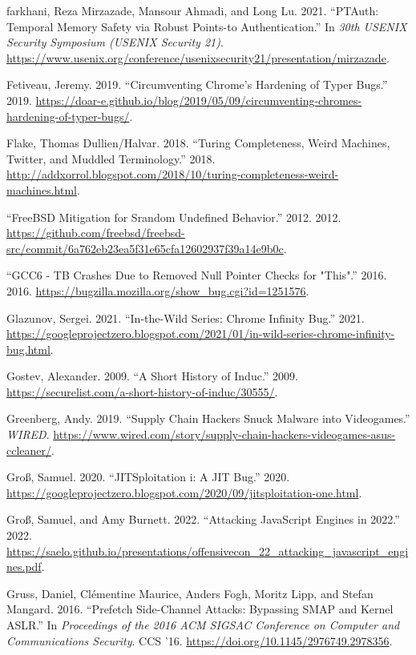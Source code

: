 \documentclass[
  a4paper,
]{report}
\newlength{\cslhangindent}
\newenvironment{CSLReferences}[2] %
{\begin{list}{}{%
	\setlength{\itemindent}{0pt}
	\setlength{\leftmargin}{0pt}
	\setlength{\parsep}{0pt}
	\ifodd #1
	\setlength{\leftmargin}{\cslhangindent}
	\setlength{\itemindent}{-1\cslhangindent}
	\fi
	\setlength{\itemsep}{#2\baselineskip}}}
{\end{list}}
\begin{document}
\begin{CSLReferences}{1}{0}
farkhani, Reza Mirzazade, Mansour Ahmadi, and Long Lu. 2021.
{``{PTAuth}: Temporal Memory Safety via Robust Points-to
Authentication.''} In \emph{30th USENIX Security Symposium (USENIX
Security 21)}.
\url{https://www.usenix.org/conference/usenixsecurity21/presentation/mirzazade}.

Fetiveau, Jeremy. 2019. {``Circumventing Chrome's Hardening of Typer
Bugs.''} 2019.
\url{https://doar-e.github.io/blog/2019/05/09/circumventing-chromes-hardening-of-typer-bugs/}.

Flake, Thomas Dullien/Halvar. 2018. {``Turing Completeness, Weird
Machines, Twitter, and Muddled Terminology.''} 2018.
\url{http://addxorrol.blogspot.com/2018/10/turing-completeness-weird-machines.html}.

{``FreeBSD Mitigation for Srandom Undefined Behavior.''} 2012. 2012.
\url{https://github.com/freebsd/freebsd-src/commit/6a762eb23ea5f31e65cfa12602937f39a14e9b0c}.

{``GCC6 - TB Crashes Due to Removed Null Pointer Checks for "This".''}
2016. 2016. \url{https://bugzilla.mozilla.org/show_bug.cgi?id=1251576}.

Glazunov, Sergei. 2021. {``In-the-Wild Series: Chrome Infinity Bug.''}
2021.
\url{https://googleprojectzero.blogspot.com/2021/01/in-wild-series-chrome-infinity-bug.html}.

Gostev, Alexander. 2009. {``A Short History of Induc.''} 2009.
\url{https://securelist.com/a-short-history-of-induc/30555/}.

Greenberg, Andy. 2019. {``Supply Chain Hackers Snuck Malware into
Videogames.''} \emph{WIRED}.
\url{https://www.wired.com/story/supply-chain-hackers-videogames-asus-ccleaner/}.

Groß, Samuel. 2020. {``JITSploitation i: A JIT Bug.''} 2020.
\url{https://googleprojectzero.blogspot.com/2020/09/jitsploitation-one.html}.

Groß, Samuel, and Amy Burnett. 2022. {``Attacking JavaScript Engines in
2022.''} 2022.
\url{https://saelo.github.io/presentations/offensivecon_22_attacking_javascript_engines.pdf}.

Gruss, Daniel, Clémentine Maurice, Anders Fogh, Moritz Lipp, and Stefan
Mangard. 2016. {``Prefetch Side-Channel Attacks: Bypassing SMAP and
Kernel ASLR.''} In \emph{Proceedings of the 2016 ACM SIGSAC Conference
on Computer and Communications Security}. CCS '16.
\url{https://doi.org/10.1145/2976749.2978356}.


\end{CSLReferences}
\end{document}

